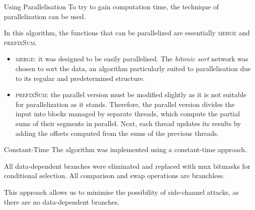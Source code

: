         \begin{frame}{Using Parallelisation}
            To try to gain computation time, the technique of parallelization can be used.  

            In this algorithm, the functions that can be parallelized are essentially \textsc{merge} and \textsc{prefixSum}.

            \begin{itemize}
                \item \textsc{merge}: it was designed to be easily parallelised. The \textit{bitonic sort} network was chosen to sort the data, an algorithm particularly suited to parallelisation due to its regular and predetermined structure.
                \item \textsc{prefixSum}: the parallel version must be modified slightly as it is not suitable for parallelization as it stands. Therefore, the parallel version divides the input into blocks managed by separate threads, which compute the partial sums of their segments in parallel. Next, each thread updates its results by adding the offsets computed from the sums of the previous threads.
            \end{itemize}
        \end{frame}

        \begin{frame}{Constant-Time}
            The algorithm was implemented using a constant-time approach.

            \leavevmode

            All data-dependent branches were eliminated and replaced with mux bitmasks for conditional selection. All comparison and swap operations are branchless.

            This approach allows us to minimise the possibility of side-channel attacks, as there are no data-dependent branches.
        \end{frame}









































